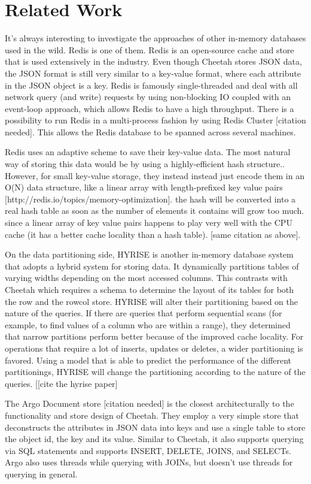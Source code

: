 \documentclass[11pt,journal,compsoc]{IEEEtran}
\begin{document}
\section{Related Work}
It’s always interesting to investigate the approaches of other in-memory databases used in the wild. Redis is one of them. Redis is an open-source cache and store that is used extensively in the industry. Even though Cheetah stores JSON data, the JSON format is still very similar to a key-value format, where each attribute in the JSON object is a key. Redis is famously single-threaded and deal with all network query (and write) requests by using non-blocking IO coupled with an event-loop approach, which allows Redis to have a high throughput. There is a possibility to run Redis in a multi-process fashion by using Redis Cluster [citation needed]. This allows the Redis database to be spanned across several machines.

Redis uses an adaptive scheme to save their key-value data. The most natural way of storing this data would be by using a highly-efficient hash structure.. However, for small key-value storage, they instead instead just encode them in an O(N) data structure, like a linear array with length-prefixed key value pairs [http://redis.io/topics/memory-optimization]. the hash will be converted into a real hash table as soon as the number of elements it contains will grow too much. since a linear array of key value pairs happens to play very well with the CPU cache (it has a better cache locality than a hash table). [same citation as above].

On the data partitioning side, HYRISE is another in-memory database system that adopts a hybrid system for storing data. It dynamically partitions tables of varying widths depending on the most accessed columns. This contrasts with Cheetah which requires a schema to determine the layout of its tables for both the row and the rowcol store. HYRISE will alter their partitioning based on the nature of the queries. If there are queries that perform sequential scans (for example, to find values of a column who are within a range), they determined that narrow partitions perform better because of the improved cache locality. For operations that require a lot of inserts, updates or deletes, a wider partitioning is favored. Using a model that is able to predict the performance of the different partitionings, HYRISE will change the partitioning according to the nature of the queries. 
[[cite the hyrise paper]

The Argo Document store [citation needed] is the closest architecturally to the functionality and store design of Cheetah. They employ a very simple store that deconstructs the attributes in JSON data into keys and use a single table to store the object id, the key and its value. Similar to Cheetah, it also supports querying via SQL statements and supports INSERT, DELETE, JOINS, and SELECTs. Argo also uses threads while querying with JOINs, but doesn’t use threads for querying in general.
\end{document}
